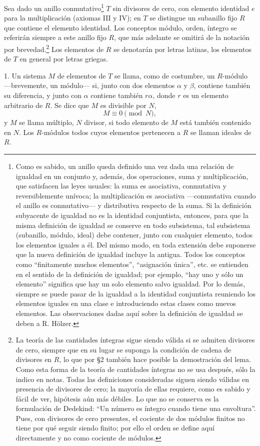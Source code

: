 \documentclass[11pt]{article}
\begin{document}
Sea dado un anillo conmutativo\footnote{Como es sabido, un anillo queda definido una vez dada una relación de igualdad en un conjunto y, además, dos operaciones, suma y multiplicación, que satisfacen las leyes usuales: la suma es asociativa, conmutativa y reversiblemente unívoca; la multiplicación es asociativa ---conmutativa cuando el anillo es conmutativo--- y distributiva respecto de la suma. Si la definición subyacente de igualdad no es la identidad conjuntista, entonces, para que la misma definición de igualdad se conserve en todo subsistema, tal subsistema (subanillo, módulo, ideal) debe contener, junto con cualquier elemento, todos los elementos iguales a él. Del mismo modo, en toda extensión debe suponerse que la nueva definición de igualdad incluye la antigua. Todos los conceptos como ``finitamente muchos elementos'', ``asignación única'', etc. se entienden en el sentido de la definición de igualdad; por ejemplo, ``hay uno y sólo un elemento'' significa que hay un solo elemento salvo igualdad. Por lo demás, siempre se puede pasar de la igualdad a la identidad conjuntista reuniendo los elementos iguales en una clase e introduciendo estas clases como nuevos elementos. Las observaciones dadas aquí sobre la definición de igualdad se deben a R. Hölzer.} $T$ sin divisores de cero, con elemento identidad $e$ para la multiplicación (axiomas III y IV); en $T$ se distingue un subanillo fijo $R$ que contiene el elemento identidad. Los conceptos módulo, orden, íntegro se referirán siempre a este anillo fijo $R$, que más adelante se omitirá de la notación por brevedad.\footnote{La teoría de las cantidades íntegras sigue siendo válida si se admiten divisores de cero, siempre que en su lugar se suponga la condición de cadena de divisores en $R$, lo que por §2 también hace posible la demostración del lema. Como esta forma de la teoría de cantidades íntegras no se usa después, sólo la indico en notas. Todas las definiciones consideradas siguen siendo válidas en presencia de divisores de cero; la mayoría de ellas requiere, como es sabido y fácil de ver, hipótesis aún más débiles. Lo que no se conserva es la formulación de Dedekind: ``Un número es íntegro cuando tiene una envoltura''. Pues, con divisores de cero presentes, el cociente de dos módulos finitos no tiene por qué seguir siendo finito; por ello el orden se define aquí directamente y no como cociente de módulos.} Los elementos de $R$ se denotarán por letras latinas, los elementos de $T$ en general por letras griegas.

1. Un sistema $M$ de elementos de $T$ se llama, como de costumbre, un $R$-módulo ---brevemente, un módulo--- si, junto con dos elementos $\alpha$ y $\beta$, contiene también su diferencia, y junto con $\alpha$ contiene también $r\alpha$, donde $r$ es un elemento arbitrario de $R$. Se dice que $M$ es divisible por $N$,
\[
        M\equiv 0 \pmod N,
\]
y $M$ se llama múltiplo, $N$ divisor, si todo elemento de $M$ está también contenido en $N$. Los $R$-módulos todos cuyos elementos pertenecen a $R$ se llaman ideales de $R$.
\end{document}
